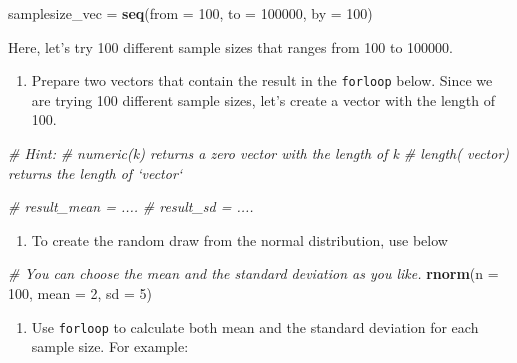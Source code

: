 \documentclass[]{book}
\newenvironment{Shaded}{\begin{snugshade}}{\end{snugshade}}
\newcommand{\CommentTok}[1]{\textcolor[rgb]{0.56,0.35,0.01}{\textit{#1}}}
\newcommand{\DataTypeTok}[1]{\textcolor[rgb]{0.13,0.29,0.53}{#1}}
\newcommand{\DecValTok}[1]{\textcolor[rgb]{0.00,0.00,0.81}{#1}}
\newcommand{\KeywordTok}[1]{\textcolor[rgb]{0.13,0.29,0.53}{\textbf{#1}}}
\newcommand{\NormalTok}[1]{#1}
\newcommand{\StringTok}[1]{\textcolor[rgb]{0.31,0.60,0.02}{#1}}
\providecommand{\tightlist}{%
  \setlength{\itemsep}{0pt}\setlength{\parskip}{0pt}}
\begin{document}
\begin{Shaded}
\begin{Highlighting}[]
\NormalTok{samplesize_vec =}\StringTok{ }\KeywordTok{seq}\NormalTok{(}\DataTypeTok{from =} \DecValTok{100}\NormalTok{, }\DataTypeTok{to =} \DecValTok{100000}\NormalTok{, }\DataTypeTok{by =} \DecValTok{100}\NormalTok{)}
\end{Highlighting}
\end{Shaded}

Here, let's try 100 different sample sizes that ranges from 100 to 100000.

\begin{enumerate}
\def\labelenumi{\arabic{enumi}.}
\setcounter{enumi}{2}
\tightlist
\item
  Prepare two vectors that contain the result in the \texttt{forloop} below. Since we are trying 100 different sample sizes, let's create a vector with the length of 100.
\end{enumerate}

\begin{Shaded}
\begin{Highlighting}[]
\CommentTok{# Hint:}
\CommentTok{# numeric(k) returns a zero vector with the length of k }
\CommentTok{# length( vector) returns the length of `vector`}

\CommentTok{# result_mean = .... }
\CommentTok{# result_sd = ....}
\end{Highlighting}
\end{Shaded}

\begin{enumerate}
\def\labelenumi{\arabic{enumi}.}
\setcounter{enumi}{3}
\tightlist
\item
  To create the random draw from the normal distribution, use below
\end{enumerate}

\begin{Shaded}
\begin{Highlighting}[]
\CommentTok{# You can choose the mean and the standard deviation as you like.}
\KeywordTok{rnorm}\NormalTok{(}\DataTypeTok{n =} \DecValTok{100}\NormalTok{, }\DataTypeTok{mean =} \DecValTok{2}\NormalTok{, }\DataTypeTok{sd =} \DecValTok{5}\NormalTok{)}
\end{Highlighting}
\end{Shaded}

\begin{enumerate}
\def\labelenumi{\arabic{enumi}.}
\setcounter{enumi}{3}
\tightlist
\item
  Use \texttt{forloop} to calculate both mean and the standard deviation for each sample size. For example:
\end{enumerate}
\end{document}
